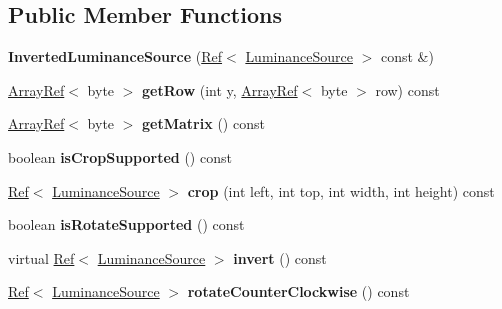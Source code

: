 \subsection*{Public Member Functions}
\begin{DoxyCompactItemize}
\item 
\mbox{\label{classzxing_1_1_inverted_luminance_source_a4f7c0914a431af5b4e1ec8936d6979c5}} 
{\bfseries Inverted\+Luminance\+Source} (\mbox{\hyperlink{classzxing_1_1_ref}{Ref}}$<$ \mbox{\hyperlink{classzxing_1_1_luminance_source}{Luminance\+Source}} $>$ const \&)
\item 
\mbox{\label{classzxing_1_1_inverted_luminance_source_a40498aa45decac32da910687d4857104}} 
\mbox{\hyperlink{classzxing_1_1_array_ref}{Array\+Ref}}$<$ byte $>$ {\bfseries get\+Row} (int y, \mbox{\hyperlink{classzxing_1_1_array_ref}{Array\+Ref}}$<$ byte $>$ row) const
\item 
\mbox{\label{classzxing_1_1_inverted_luminance_source_a4ac3e21f91fcd543108f0471768457cc}} 
\mbox{\hyperlink{classzxing_1_1_array_ref}{Array\+Ref}}$<$ byte $>$ {\bfseries get\+Matrix} () const
\item 
\mbox{\label{classzxing_1_1_inverted_luminance_source_a12fd4910ef23c37b921213c428e3c6ef}} 
boolean {\bfseries is\+Crop\+Supported} () const
\item 
\mbox{\label{classzxing_1_1_inverted_luminance_source_a4a91901986e066bec7209e780214c1fa}} 
\mbox{\hyperlink{classzxing_1_1_ref}{Ref}}$<$ \mbox{\hyperlink{classzxing_1_1_luminance_source}{Luminance\+Source}} $>$ {\bfseries crop} (int left, int top, int width, int height) const
\item 
\mbox{\label{classzxing_1_1_inverted_luminance_source_a0e7eab84f109a79454fc1e428f044bd3}} 
boolean {\bfseries is\+Rotate\+Supported} () const
\item 
\mbox{\label{classzxing_1_1_inverted_luminance_source_aa6ecafd58da90325f51183ff57955aab}} 
virtual \mbox{\hyperlink{classzxing_1_1_ref}{Ref}}$<$ \mbox{\hyperlink{classzxing_1_1_luminance_source}{Luminance\+Source}} $>$ {\bfseries invert} () const
\item 
\mbox{\label{classzxing_1_1_inverted_luminance_source_aaacc9bb5543813ccb564c6dab2a627fc}} 
\mbox{\hyperlink{classzxing_1_1_ref}{Ref}}$<$ \mbox{\hyperlink{classzxing_1_1_luminance_source}{Luminance\+Source}} $>$ {\bfseries rotate\+Counter\+Clockwise} () const
\end{DoxyCompactItemize}


